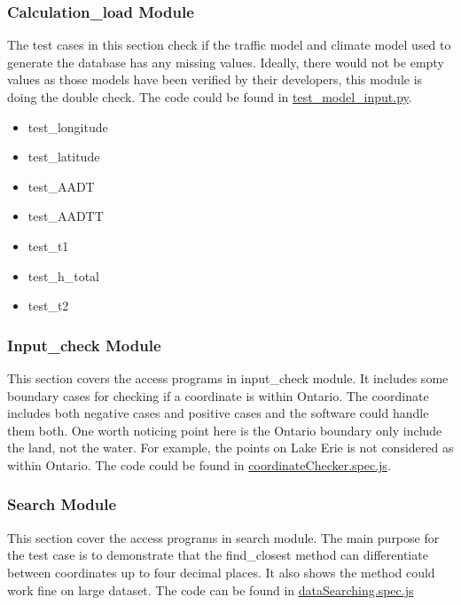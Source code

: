 \documentclass[12pt, titlepage]{article}
\begin{document}
\subsubsection{Calculation\_load Module} \label{CLM}
The test cases in this section check if the traffic model and climate model used to generate the database has any missing values. Ideally, there would not be empty values as those models have been verified by their developers, this module is doing the double check. The code could be found in \href{https://github.com/smiths/BridgeChlorideExposurePredictor/blob/main/src/database/test_model_input.py}{test\_model\_input.py}.
\begin{itemize}
\item test\_longitude
\item test\_latitude
\item test\_AADT
\item test\_AADTT
\item test\_t1
\item test\_h\_total
\item test\_t2
\end{itemize}

\subsubsection{Input\_check Module} \label{ICM}
This section covers the access programs in input\_check module. It includes some boundary cases for checking if a coordinate is within Ontario. The coordinate includes both negative cases and positive cases and the software could handle them both. One worth noticing point here is the Ontario boundary only include the land, not the water. For example, the points on Lake Erie is not considered as within Ontario. The code could be found in \href{https://github.com/smiths/BridgeChlorideExposurePredictor/blob/main/src/web/tests/unit/coordinateChecker.spec.js}{coordinateChecker.spec.js}.

\subsubsection{Search Module} \label{SM}
This section cover the access programs in search module. The main purpose for the test case is to demonstrate that the find\_closest method can differentiate between coordinates up to four decimal places. It also shows the method could work fine on large dataset. The code can be found in \href{https://github.com/smiths/BridgeChlorideExposurePredictor/blob/main/src/web/tests/unit/dataSearching.spec.js}{dataSearching.spec.js}
\end{document}
